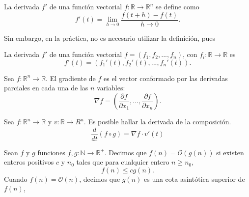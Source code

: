     \begin{definition}
        La derivada $f'$ de una función vectorial $f: \mathbb R \to \mathbb R^n$ se define como
        \begin{equation}
            f'(t) = \lim_{h\to 0} \frac{f(t+h)- f(t)}{h\to 0}.
        \end{equation}
    \end{definition}
    Sin embargo, en la práctica, no es necesario utilizar la definición, pues 
    \begin{theorem}
        La derivada $f'$ de una función vectorial $f = (f_1, f_2, ..., f_n)$, con $f_i: \mathbb R \to \mathbb R$ es
        \begin{equation}
            f'(t) = (f_1'(t), f_2'(t), ..., f_n'(t)).
        \end{equation}
    \end{theorem}
    \begin{definition}[Gradiente]
        Sea $f: \mathbb R^n \to \mathbb R$. El gradiente de $f$ es el vector conformado por las derivadas parciales en cada una de las $n$ variables:
        \begin{equation}
            \nabla f = \left(\frac{\partial f}{\partial x_1}, ..., \frac{\partial f}{\partial x_n}\right).
        \end{equation}
    \end{definition}
    \begin{proposition}
        Sea $f: \mathbb R^n \to \mathbb R$ y $v: \mathbb R \to R^n$. Es posible hallar la derivada de la composición.
        \begin{equation}
            \frac{d}{dt}(f\circ g) = \nabla f \cdot  v'(t)
        \end{equation}
    \end{proposition}

    \begin{definition}
        Sean $f$ y $g$ funciones $f,g:\mathbb N \to \mathbb R^+$. Decimos que $f(n) = \mathcal O(g(n))$ si existen enteros positivos $c$ y $n_0$ tales que para cualquier entero $n\geq n_0$,
        \begin{equation}
            f(n) \leq cg(n).
        \end{equation}
        Cuando $f(n) = \mathcal O(n)$, decimos que $g(n)$ es una cota asintótica superior de $f(n)$,
    \end{definition}

